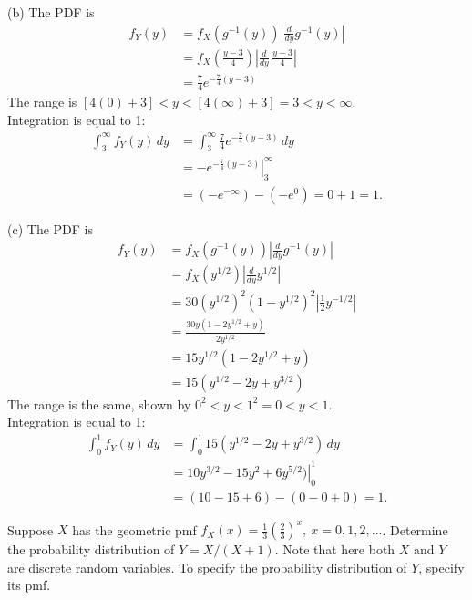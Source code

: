 \documentclass[12pt,letterpaper]{exam}
\begin{document}
\begin{questions}
\begin{solution}
		
		(b)
		The PDF is
		\begin{align*}
			f_Y(y) &= f_X(g^{-1}(y)) \left|\frac{d}{dy}g^{-1}(y) \right| \\
			&= f_X( \frac{y-3}{4} ) \left|\frac{d}{dy}\,\frac{y-3}{4}  \right| \\
			&= \frac{7}{4}e^{-\frac{7}{4}(y-3)}
		\end{align*}
		The range is $ \left[4(0)+3\right] < y < \left[4(\infty)+3\right] = 3 < y < \infty$. \\
		Integration is equal to 1:
		\begin{align*}
			\int_{3}^{\infty}f_Y(y) \,dy
			&= \int_{3}^{\infty} \frac{7}{4}e^{-\frac{7}{4}(y-3)} \,dy \\
			&= \left. -e^{-\frac{7}{4}(y-3)} \right|_3^\infty \\
			&= (-e^{-\infty}) - (-e^0)
			= 0 + 1 = 1.
		\end{align*}
		
		(c)
		The PDF is
		\begin{align*}
			f_Y(y) &= f_X(g^{-1}(y)) \left|\frac{d}{dy}g^{-1}(y) \right| \\
			&= f_X( y^{1/2} ) \left|\frac{d}{dy} y^{1/2} \right| \\
			&=  30(y^{1/2})^2(1-y^{1/2})^2  \left|\frac{1}{2} y^{-1/2} \right| \\
			&= \frac{ 30y(1-2y^{1/2} + y) }{2y^{1/2}} \\
			&= 15y^{1/2}(1-2y^{1/2} + y) \\
			&= 15(y^{1/2}-2y + y^{3/2})
		\end{align*}
		The range is the same, shown by $ 0^{2} < y < 1^{2} = 0 < y < 1$. \\
		Integration is equal to 1:
		\begin{align*}
			\int_{0}^{1}f_Y(y) \,dy
			&= \int_{0}^{1} 15(y^{1/2}-2y + y^{3/2}) \,dy \\
			&= \left. 10y^{3/2}-15y^2 + 6y^{5/2}) \right|_0^1 \\
			&= (10-15+6) - (0-0+0) = 1.
		\end{align*}
		
	\end{solution}
	
	\setcounter{question}{2}
	\question Suppose $X$ has the geometric pmf $f_X(x) = \frac{1}{3} \left(\frac{2}{3}\right)^{x}, \ x = 0,1,2,...$. Determine the probability distribution of $Y= X/(X+1)$. 
	Note that here both $X$ and $Y$ are discrete random variables. To specify the probability distribution of $Y$, specify its pmf.
	

\end{questions}
\end{document}
